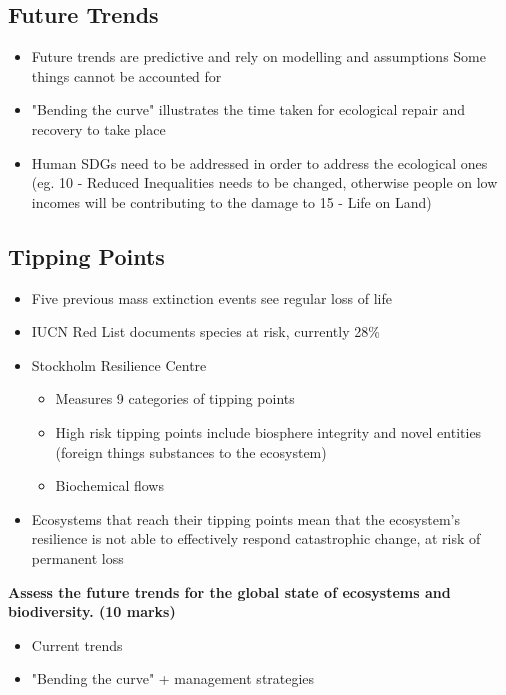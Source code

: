 	\subsection{Future Trends}
	
		\begin{itemize}
			\item Future trends are predictive and rely on modelling and assumptions
				\subitem Some things cannot be accounted for
			\item "Bending the curve" illustrates the time taken for ecological repair and recovery to take place
			\item Human SDGs need to be addressed in order to address the ecological ones (eg. 10 - Reduced Inequalities needs to be changed, otherwise people on low incomes will be contributing to the damage to 15 - Life on Land)
		\end{itemize}

	\subsection{Tipping Points}
	
		\begin{itemize}
			\item Five previous mass extinction events see regular loss of life
			\item IUCN Red List documents species at risk, currently 28\%
			\item Stockholm Resilience Centre
				\begin{itemize}
					\item Measures 9 categories of tipping points
					\item High risk tipping points include biosphere integrity and novel entities (foreign things substances to the ecosystem)
					\item Biochemical flows
				\end{itemize}
			\item Ecosystems that reach their tipping points mean that the ecosystem's resilience is not able to effectively respond catastrophic change, at risk of permanent loss
		\end{itemize}

\textbf{Assess the future trends for the global state of ecosystems and biodiversity. (10 marks)}

	\begin{itemize}
		\item Current trends
		\item "Bending the curve" + management strategies
	\end{itemize}

